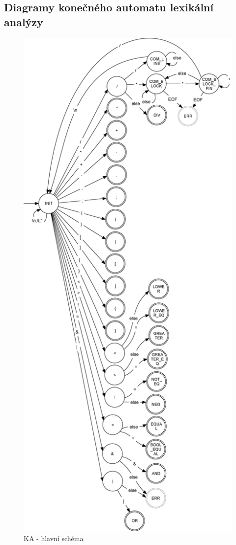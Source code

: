 \documentclass[a4paper,11pt]{article}
\begin{document}
\subsection{Diagramy konečného automatu lexikální analýzy}
\label{diag:LA-FSM}
\begin{figure}[H]
	\centering
	\includegraphics[scale=.308]{FSM_MAIN.eps}
	\caption{KA - hlavní schéma}
\end{figure}
\end{document}
